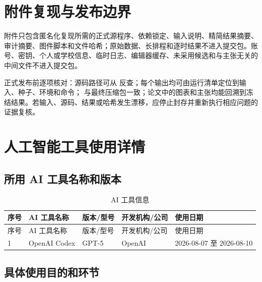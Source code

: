 \section{附件复现与发布边界}
\label{app:release-boundary}

附件只包含匿名化复现所需的正式源程序、依赖锁定、输入说明、精简结果摘要、审计摘要、图件脚本和文件哈希；原始数据、长排程和逐时结果不进入提交包。账号、密钥、个人或学校信息、临时日志、编辑器缓存、未采用候选和与主张无关的中间文件不进入提交包。

正式发布前逐项核对：源码路径可从  反查；每个输出均可由运行清单定位到输入、种子、环境和命令； 与最终压缩包一致；论文中的图表和主张均能回溯到冻结结果。若输入、源码、结果或哈希发生漂移，应停止封存并重新执行相应问题的证据复核。

\section{人工智能工具使用详情}

\subsection{所用 AI 工具名称和版本}

\begin{longtable}{p{}p{}p{}p{}p{}}
\caption{AI 工具信息}\label{tab:ai-tool-info}\\
\toprule
序号 & AI 工具名称 & 版本/型号 & 开发机构/公司 & 使用日期 \\
\midrule
\endfirsthead
\toprule
序号 & AI 工具名称 & 版本/型号 & 开发机构/公司 & 使用日期 \\
\midrule
\endhead
1 & OpenAI Codex & GPT-5 & OpenAI & 2026-08-07 至 2026-08-10 \\
\bottomrule
\end{longtable}

\subsection{具体使用目的和环节}

